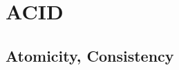 \documentclass[12pt]{article}
\begin{document}
\section{ACID}
\subsection{Atomicity, Consistency}
\begin{comment}

Zagadnienia do rozważenia:
 * możliwość awarii systemu podczas transakcji
 * równoczesny dostęp do danych, równoczesne wykonywanie transakcji

Własności transakcji
 * consistency
    read(A)
    A = A - 50
    write(A)
    read(B)
    B = B + 50
    write(B)
    A + B = const
    na przykład awaria między 3 i 4 powoduje, że baza powróci do stanu pierwotnego
 * trwałość
    zmiany mają charakter trwały
 * izolacja
    transakcje są wykonywane w całowitej izolacji (dla innych transakcji nie są widoczne
    do czasu zatwierdzenia

Stany transakcji:

 active -> partially commited -> commited
 active -> failed
 partially commited -> failed -> aborted

 Gdy nastąpi awaria, to tranakcja zostaje w stanie dowolnym (!)
 Po restarcie SZBD przegląda niedokończone transakcje i doprowadza je do końca

W jaki sposób zapewnić transakcyjność?

 * shadow database: kopiujemy bazę, i po udanej transakcji usuwamy starą bazę i wskaźnik wskazuje na nową
   (izolacja: po kolei)
   - prosta implementacja
   - nieefektywna (kopiowanie _całej_ bazy danych?!)
   - krótkie transakcje czekają na jedną długą

 * algorytmy zapewniające niepodzielność i trwałość
   Metody pozwalające odtworzyć stan bazy w przypadku awarii, powszechnie stosujemy system logów.
   - awarie transakcji:
    * użytkownik - rollback (jawnie)
    * serwer - na przykład naruszenie warunku integralnościowego
   - awarie aplikacji
    * awaria połączenia itp
   - awarie na poziomie serwera baz danych
    * system crash (utrata danych w pamięci)
    * uszkodzenie dysku (utrata danych na dysku)

   1. Akcje podejmowanie podczas normalnego wykonywania się transkcji
   2. Akcje podejmowane po awarii w celu odtworzenia stanu bazy

   INPUT(X) -- blok z dysku zawierający element X jest kopiowany do pamięci
   READ(X, t) -- jeżeli w pamięci nie ma bloku X, to INPUT(X), następnie t := x
   WRITE(X, t) -- jeżeli bloku zwierającego X nie ma w pamięci to INPUT(X), następnie X := t
   OUTPUT(X) -- zawartość bufora kopiowania na dysk


\end{comment}
\end{document}

